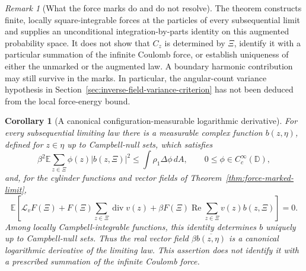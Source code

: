 \documentclass[11pt,a4paper]{article}
\numberwithin{equation}{section}
\newtheorem{corollary}[theorem]{Corollary}
\theoremstyle{definition}
\theoremstyle{remark}
\newtheorem{remark}[theorem]{Remark}
\newcommand{\D}{\mathbb D}
\newcommand{\E}{\mathbb E}
\begin{document}
\begin{remark}[What the force marks do and do not resolve]
The theorem constructs finite, locally square-integrable forces at the
particles of every subsequential limit and supplies an unconditional
integration-by-parts identity on this augmented probability space.
It does not show that $C_z$ is determined by $\Xi$, identify it with a
particular summation of the infinite Coulomb force, or establish
uniqueness of either the unmarked or the augmented law. A boundary
harmonic contribution may still survive in the marks. In particular,
the angular-count variance hypothesis in
Section~\ref{sec:inverse-field-variance-criterion} has not been deduced
from the local force-energy bound.
\end{remark}


\begin{corollary}[A canonical configuration-measurable logarithmic derivative]
\label{cor:canonical-force-score}
For every subsequential limiting law there is a measurable complex
function $b(z,\eta)$, defined for $z\in\eta$ up to Campbell-null sets,
which satisfies
\[
 \beta^2\E\sum_{z\in\Xi}\phi(z)|b(z,\Xi)|^2
 \le \int\rho_1\Delta\phi\,dA,
 \qquad 0\le\phi\in C_c^\infty(\D),
\]
and, for the cylinder functions and vector fields of
Theorem~\ref{thm:force-marked-limit},
\[
 \E\left[\mathcal L_vF(\Xi)
 +F(\Xi)\sum_{z\in\Xi}\operatorname{div}v(z)
 +\beta F(\Xi)\operatorname{Re}
       \sum_{z\in\Xi}v(z)b(z,\Xi)\right]=0.
\]
Among locally Campbell-integrable functions, this identity determines
$b$ uniquely up to Campbell-null sets. Thus the real vector field
$\beta\overline{b(z,\eta)}$ is a canonical logarithmic derivative of the
limiting law. This assertion does not identify it with a prescribed
summation of the infinite Coulomb force.
\end{corollary}
\end{document}
